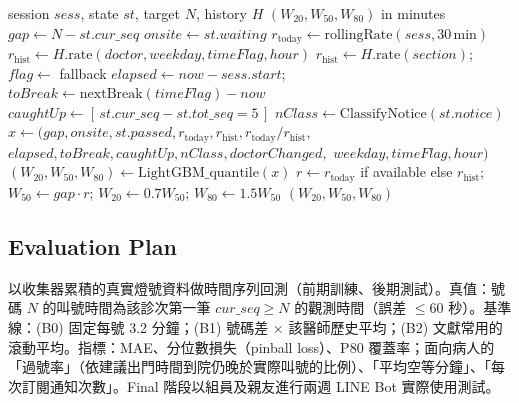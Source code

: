 \documentclass[11pt,twocolumn]{article}
\begin{document}
\begin{algorithm}[!htb]
\caption{Wait-Time Estimation with Domain Features}
\label{alg:pred}
\linespread{1.0}\selectfont\begin{algorithmic}[1]\footnotesize
\REQUIRE session $\mathit{sess}$, state $st$, target $N$, history $H$
\ENSURE $(W_{20},W_{50},W_{80})$ in minutes
\STATE $\mathit{gap} \leftarrow N - st.\mathit{cur\_seq}$ 
\STATE $\mathit{onsite} \leftarrow st.\mathit{waiting}$ 
\STATE $r_{\mathrm{today}} \leftarrow \mathrm{rollingRate}(\mathit{sess}, 30\,\mathrm{min})$ 
\STATE $r_{\mathrm{hist}} \leftarrow H.\mathrm{rate}(\mathit{doctor},\mathit{weekday},\mathit{timeFlag},\mathit{hour})$
 \STATE $r_{\mathrm{hist}} \leftarrow H.\mathrm{rate}(\mathit{section})$; $\mathit{flag}\leftarrow$ fallback \ENDIF
\STATE $\mathit{elapsed} \leftarrow \mathit{now}-\mathit{sess}.\mathit{start}$; $\mathit{toBreak} \leftarrow \mathrm{nextBreak}(\mathit{timeFlag})-\mathit{now}$
\STATE $\mathit{caughtUp} \leftarrow [\,st.\mathit{cur\_seq}-st.\mathit{tot\_seq}=5\,]$ 
\STATE $\mathit{nClass} \leftarrow \mathrm{ClassifyNotice}(st.\mathit{notice})$ 
\STATE $x \leftarrow (\mathit{gap},\mathit{onsite},st.\mathit{passed},r_{\mathrm{today}},r_{\mathrm{hist}},r_{\mathrm{today}}/r_{\mathrm{hist}},$
\STATE \hspace{1.2em}$\mathit{elapsed},\mathit{toBreak},\mathit{caughtUp},\mathit{nClass},\mathit{doctorChanged},$
\STATE \hspace{1.2em}$\mathit{weekday},\mathit{timeFlag},\mathit{hour})$
  \STATE $(W_{20},W_{50},W_{80}) \leftarrow \mathrm{LightGBM\_quantile}(x)$
\ELSE
  \STATE $r \leftarrow r_{\mathrm{today}}$ if available else $r_{\mathrm{hist}}$; $W_{50}\leftarrow \mathit{gap}\cdot r$; $W_{20}\leftarrow 0.7W_{50}$; $W_{80}\leftarrow 1.5W_{50}$ 
\ENDIF
\RETURN $(W_{20},W_{50},W_{80})$
\end{algorithmic}
\end{algorithm}

\subsection{Evaluation Plan}
以收集器累積的真實燈號資料做時間序列回測（前期訓練、後期測試）。真值：號碼 $N$ 的叫號時間為該診次第一筆 $\mathit{cur\_seq}\geq N$ 的觀測時間（誤差 $\leq$60 秒）。基準線：(B0) 固定每號 3.2 分鐘；(B1) 號碼差 $\times$ 該醫師歷史平均；(B2) 文獻常用的滾動平均。指標：MAE、分位數損失（pinball loss）、P80 覆蓋率；面向病人的「過號率」（依建議出門時間到院仍晚於實際叫號的比例）、「平均空等分鐘」、「每次訂閱通知次數」。Final 階段以組員及親友進行兩週 LINE Bot 實際使用測試。
\end{document}
